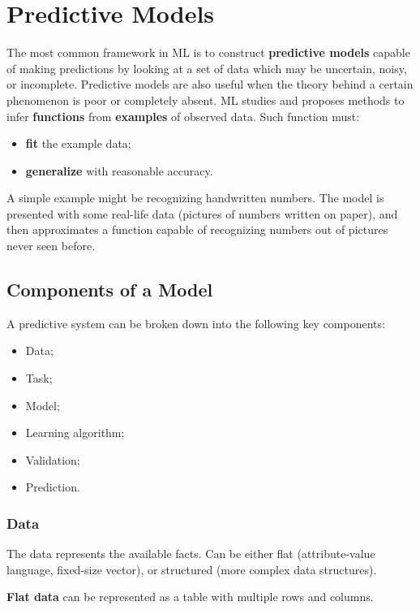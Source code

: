 \chapter{Predictive Models}

The most common framework in ML is to construct \textbf{predictive models} capable of making predictions by looking at a set of data which may be uncertain, noisy, or incomplete. Predictive models are also useful when the theory behind a certain phenomenon is poor or completely absent. ML studies and proposes methods to infer \textbf{functions} from \textbf{examples} of observed data. Such function must:
    \begin{itemize}
        \item \textbf{fit} the example data;
        \item \textbf{generalize} with reasonable accuracy.
    \end{itemize}

A simple example might be recognizing handwritten numbers. The model is presented with some real-life data (pictures of numbers written on paper), and then approximates a function capable of recognizing numbers out of pictures never seen before. 

\section{Components of a Model}

A predictive system can be broken down into the following key components:

\begin{itemize}
    \item Data;
    \item Task;
    \item Model;
    \item Learning algorithm;
    \item Validation;
    \item Prediction.
\end{itemize}

\subsection{Data}

The data represents the available facts. Can be either flat (attribute-value language, fixed-size vector), or structured (more complex data structures).

\textbf{Flat data} can be represented as a table with multiple rows and columns.

